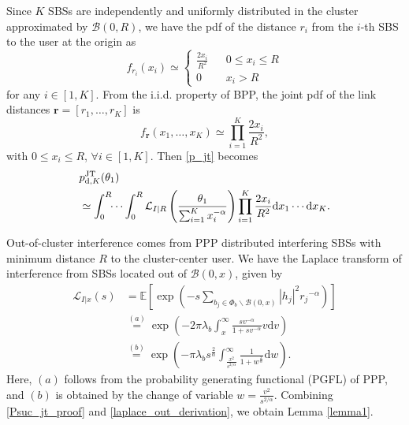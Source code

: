 \documentclass[twocolumns,10pt]{IEEEtran}
\begin{document}
Since $K$ SBSs are independently and uniformly distributed in the cluster approximated by $\mathcal{B}(0, R)$, we have the pdf of the distance $r_i$ from the $i$-th SBS to the user at the origin as
\begin{equation}
f_{r_i}(x_i)\simeq \left\{
\begin{array}{rcl}
\frac{2x_i}{R^2} & & 0 \leq x_i \leq R\\
0 &  & x_i > R
\end{array} \right.
\end{equation}
for any $i\in [1, K]$. From the i.i.d. property of BPP, the joint pdf of the link distances $\mathbf{r}=[r_1, \ldots, r_K]$ is 
\begin{equation}
f_{\mathbf{r}}(x_1, \ldots, x_K)\simeq  \prod\limits_{i=1}^{K} \frac{2 x_i}{R^2},
\label{pdf_distance_jt}
\end{equation}
with $0 \leq x_i \leq R$, $\forall i\in [1, K]$.
Then \eqref{p_jt} becomes
\begin{equation}
\begin{split}
&p_{\textnormal{d},K}^{\textnormal{JT}}(\theta_1)  \\
& \simeq \int_{0}^{R}\!\!\cdots\int_{0}^{R} \mathcal{L}_{I|R} \left(\frac{\theta_1}{\sum_{i=1}^{K}x_i^{-\alpha}}\right) \prod\limits_{i=1}^{K} \frac{2 x_i}{R^2} \textnormal{d}x_1 \cdots \textnormal{d}x_K.
\end{split}
\label{Psuc_jt_proof}
\end{equation} 

Out-of-cluster interference comes from PPP distributed interfering SBSs with minimum distance $R$ to the cluster-center user. We have the Laplace transform of interference from SBSs located out of $\mathcal{B}(0, x)$, given by 
\begin{align}
\mathcal{L}_{I|x} (s)&=\mathbb{E}\left[\exp\left(- s \sum\limits_{b_j\in \Phi_b \backslash \mathcal{B}(0, x)}|h_j|^2 {r_j}^{-\alpha}\right)\right] \nonumber \\
&\mathop{=}\limits^{(a)}\exp\left(-2\pi \lambda_b \int_{x}^{\infty} \frac{sv^{-\alpha}}{1+sv^{-\alpha}}v \text{d}v\right) \nonumber \\
&\mathop{=}\limits^{(b)} \exp\left(-\pi \lambda_b s^{\frac{2}{\alpha}} \int_{\frac{x^2}{s^{2/\alpha}}}^{\infty} \frac{1}{1+w^{\frac{2}{\alpha}}} \text{d}w\right).
\label{laplace_out_derivation}
\end{align}
Here, $(a)$ follows from the probability generating functional (PGFL) of PPP, and $(b)$ is obtained by the change of variable $w=\frac{v^2}{s^{2/\alpha}}$. Combining \eqref{Psuc_jt_proof} and \eqref{laplace_out_derivation}, we obtain Lemma \ref{lemma1}.
\end{document}
